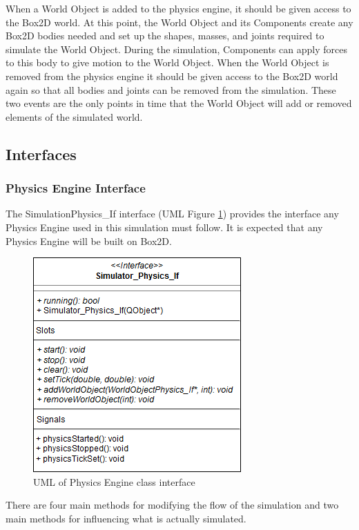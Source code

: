	When a World Object is added to the physics engine, it should be given access to the Box2D world. At this point, the World Object and its Components create any Box2D bodies needed and set up the shapes, masses, and joints required to simulate the World Object. During the simulation, Components can apply forces to this body to give motion to the World Object. When the World Object is removed from the physics engine it should be given access to the Box2D world again so that all bodies and joints can be removed from the simulation. These two events are the only points in time that the World Object will add or removed elements of the simulated world.
  
  
  \subsection{Interfaces}
  \subsubsection*{Physics Engine Interface}
  The SimulationPhysics\_If interface (UML Figure \ref{uml:phys_if}) provides the interface any Physics Engine used in this simulation must follow. It is expected that any Physics Engine will be built on Box2D.
  
 \begin{figure}[h]
 	\begin{center}
 	\includegraphics[scale=0.5]{./images_design/uml/Physics_Engine_If}
 	\caption{UML of Physics Engine class interface\label{uml:phys_if}}
 	\end{center}
 \end{figure}  
  
  There are four main methods for modifying the flow of the simulation and two main methods for influencing what is actually simulated.
  
